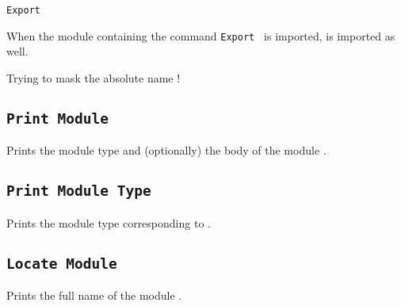 \begin{Variants}
\item{\tt Export {\qualid}}

  When the module containing the command {\tt Export {\qualid}} is
  imported, {\qualid} is imported as well.
\end{Variants}

\begin{ErrMsgs}
  \item {}
\end{ErrMsgs}

\begin{Warnings}
  \item Trying to mask the absolute name {\qualid} !
\end{Warnings}

\subsection{\tt Print Module {\ident}
}

Prints the module type and (optionally) the body of the module {\ident}.

\subsection{\tt Print Module Type {\ident}
}

Prints the module type corresponding to {\ident}.

\subsection{\tt Locate Module {\qualid}
}

Prints the full name of the module {\qualid}.


